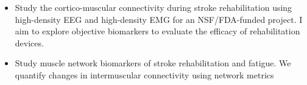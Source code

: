\documentclass[10pt,letter,ragged2e]{altacv}
\begin{document}

\begin{fullwidth}
\makecvheader
\end{fullwidth}



\begin{itemize}
\item Study the cortico-muscular connectivity during stroke rehabilitation using high-density EEG and high-density EMG for an NSF/FDA-funded project. I aim to explore objective biomarkers to evaluate the efficacy of rehabilitation devices.
\smallskip
\item Study muscle network biomarkers of stroke rehabilitation and fatigue. We quantify changes in intermuscular connectivity using network metrics
\end{itemize}

\divider
\end{document}
